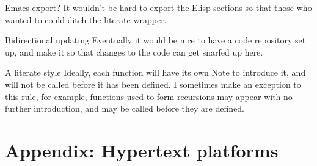 \begin{notate}{Emacs-export?}
It wouldn't be hard to export the Elisp sections so
that those who wanted to could ditch the literate
wrapper.
\end{notate}

\begin{notate}{Bidirectional updating}
Eventually it would be nice to have a code repository set
up, and make it so that changes to the code can get
snarfed up here.
\end{notate}

\begin{notate}{A literate style}
Ideally, each function will have its own Note to introduce
it, and will not be called before it has been defined.  I
sometimes make an exception to this rule, for example,
functions used to form recursions may appear with no
further introduction, and may be called before they are
defined.
\end{notate}

\section{Appendix: Hypertext platforms} \label{appendix-hyper}

